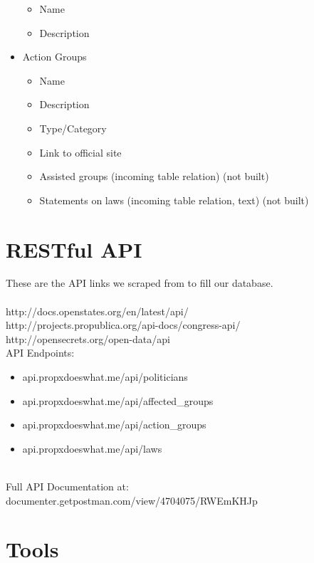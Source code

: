 \documentclass[12pt]{article}
\begin{document}
\begin{itemize}
\begin{itemize}
		\item Name
		\item Description
	\end{itemize}
	\item[] Action Groups
	\begin{itemize}
		\item Name
		\item Description
		\item Type/Category
		\item Link to official site
		\item Assisted groups (incoming table relation) (not built)
		\item Statements on laws (incoming table relation, text) (not built)
	\end{itemize}
\end{itemize}

\section{RESTful API}
These are the API links we scraped from to fill our database.\\ \\http://docs.openstates.org/en/latest/api/ \\http://projects.propublica.org/api-docs/congress-api/ \\http://opensecrets.org/open-data/api\\

API Endpoints: \\

\begin{itemize}
	\item api.propxdoeswhat.me/api/politicians
	\item api.propxdoeswhat.me/api/affected\_groups
	\item api.propxdoeswhat.me/api/action\_groups
	\item api.propxdoeswhat.me/api/laws
\end{itemize}

~\\
Full API Documentation at: documenter.getpostman.com/view/4704075/RWEmKHJp

\section{Tools}
\end{document}
